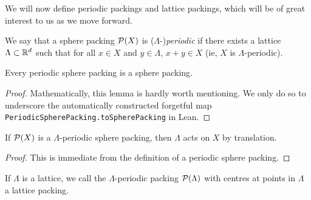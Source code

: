 We will now define periodic packings and lattice packings, which will be of great interest to us as we move forward.

\begin{definition}\label{PeriodicSpherePacking}\leanok
  We say that a sphere packing $\mathcal{P}(X)$ is ($\Lambda$-)\emph{periodic} if there exists a lattice $\Lambda \subset \mathbb{R}^d$ such that for all $x \in X$ and $y \in \Lambda$, $x + y \in X$ (ie, $X$ is $\Lambda$-periodic).
\end{definition}

\begin{lemma}\label{PeriodicSpherePacking.toSpherePacking}\leanok
  Every periodic sphere packing is a sphere packing.
\end{lemma}
\begin{proof}
  Mathematically, this lemma is hardly worth mentioning. We only do so to underscore the automatically constructed forgetful map \verb|PeriodicSpherePacking.toSpherePacking| in Lean.
\end{proof}

\begin{lemma}\label{PeriodicSpherePacking.instAddAction}\leanok
  If $\mathcal{P}(X)$ is a $\Lambda$-periodic sphere packing, then $\Lambda$ acts on $X$ by translation.
\end{lemma}
\begin{proof}\leanok
  This is immediate from the definition of a periodic sphere packing.
\end{proof}

\begin{definition}
  If $\Lambda$ is a lattice, we call the $\Lambda$-periodic packing $\mathcal{P}(\Lambda)$ with centres at points in $\Lambda$ a lattice packing.
\end{definition}

